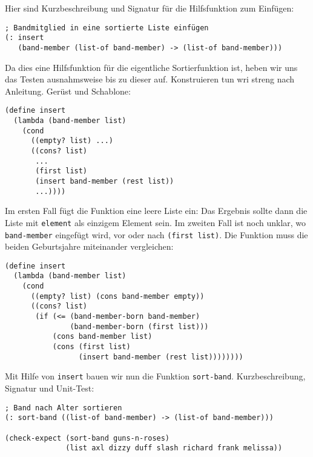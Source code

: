 
Hier sind Kurzbeschreibung und Signatur für die Hilfsfunktion zum Einfügen:
%
\begin{lstlisting}
; Bandmitglied in eine sortierte Liste einfügen
(: insert
   (band-member (list-of band-member) -> (list-of band-member)))
\end{lstlisting}
%
Da dies eine Hilfsfunktion für die eigentliche Sortierfunktion ist,
heben wir uns das Testen ausnahmsweise bis zu dieser auf.
Konstruieren tun wri streng nach Anleitung.  Gerüst und Schablone:
%
\begin{lstlisting}
(define insert
  (lambda (band-member list)
    (cond
      ((empty? list) ...)
      ((cons? list)
       ...
       (first list)
       (insert band-member (rest list))
       ...))))
\end{lstlisting}
%
Im ersten Fall fügt die Funktion eine leere Liste ein: Das Ergebnis
sollte dann die Liste mit \lstinline{element} als einzigem Element
sein.  Im zweiten Fall ist noch unklar, wo \lstinline{band-member}
eingefügt wird, vor oder nach \lstinline{(first list)}.  Die Funktion
muss die beiden Geburtsjahre miteinander vergleichen:
%
\begin{lstlisting}
(define insert
  (lambda (band-member list)
    (cond
      ((empty? list) (cons band-member empty))
      ((cons? list)
       (if (<= (band-member-born band-member)
               (band-member-born (first list)))
           (cons band-member list)
           (cons (first list)
                 (insert band-member (rest list))))))))
\end{lstlisting}
%
Mit Hilfe von \lstinline{insert} bauen wir nun die Funktion
\lstinline{sort-band}.  Kurzbeschreibung, Signatur und Unit-Test:
%
\begin{lstlisting}
; Band nach Alter sortieren
(: sort-band ((list-of band-member) -> (list-of band-member)))

(check-expect (sort-band guns-n-roses)
              (list axl dizzy duff slash richard frank melissa))
\end{lstlisting}
